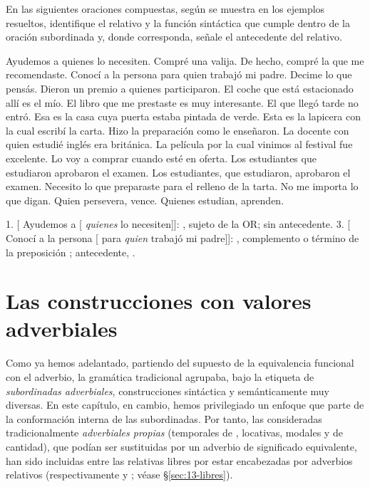 \begin{ejercicio}\label{ej:13-relativos}
En las siguientes oraciones compuestas, según se muestra en los ejemplos
resueltos, identifique el relativo y la función sintáctica que cumple dentro de
la oración subordinada y, donde corresponda, señale el antecedente del relativo.

\begin{exe}
  \ex Ayudemos a quienes lo necesiten.
  \ex Compré una valija. De hecho, compré la que me recomendaste.
  \ex Conocí a la persona para quien trabajó mi padre.
  \ex Decime lo que pensás.
  \ex Dieron un premio a quienes participaron.
  \ex El coche que está estacionado allí es el mío.
  \ex El libro que me prestaste es muy interesante.
  \ex El que llegó tarde no entró.
  \ex Esa es la casa cuya puerta estaba pintada de verde.
  \ex Esta es la lapicera con la cual escribí la carta.
  \ex Hizo la preparación como le enseñaron.
  \ex La docente con quien estudié inglés era británica.
  \ex La película por la cual vinimos al festival fue excelente.
  \ex Lo voy a comprar cuando esté en oferta.
  \ex Los estudiantes que estudiaron aprobaron el examen.
  \ex Los estudiantes, que estudiaron, aprobaron el examen.
  \ex Necesito lo que preparaste para el relleno de la tarta.
  \ex No me importa lo que digan.
  \ex Quien persevera, vence.
  \ex Quienes estudian, aprenden.
\end{exe}

\begin{resuelto}
1. [ Ayudemos a [ \textit{quienes} lo necesiten]]:
, sujeto de la OR; sin antecedente. 3. [ Conocí a la
persona [ para \textit{quien} trabajó mi padre]]: ,
complemento o término de la preposición ; antecedente,
.
\end{resuelto}
\end{ejercicio}

\section{Las construcciones con valores adverbiales}\label{sec:13-adverbiales}

Como ya hemos adelantado, partiendo del supuesto de la equivalencia funcional con
el adverbio, la gramática tradicional agrupaba, bajo la etiqueta de
\textit{subordinadas adverbiales}, construcciones sintáctica y semánticamente muy
diversas. En este capítulo, en cambio, hemos privilegiado un enfoque que parte de
la conformación interna de las subordinadas. Por tanto, las consideradas
tradicionalmente \textit{adverbiales propias} (temporales de ,
locativas, modales y de cantidad), que podían ser sustituidas por un adverbio de
significado equivalente, han sido incluidas entre las relativas libres por estar
encabezadas por adverbios relativos (respectivamente 
y ; véase §\ref{sec:13-libres}).

